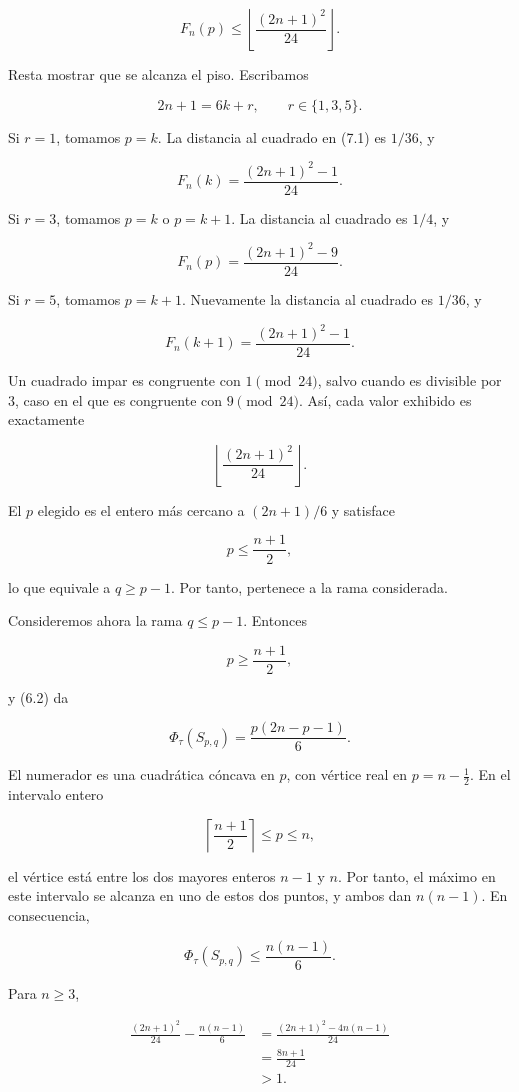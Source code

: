 \documentclass[
  spanish,
  11pt,
  a4paper,
]{article}
\begin{document}
\[
F_n(p)
\le
\left\lfloor\frac{(2n+1)^2}{24}\right\rfloor.
\]

Resta mostrar que se alcanza el piso. Escribamos

\[
2n+1=6k+r,
\qquad
r\in\{1,3,5\}.
\]

Si \(r=1\), tomamos \(p=k\). La distancia al cuadrado en (7.1) es \(1/36\), y

\[
F_n(k)
=
\frac{(2n+1)^2-1}{24}.
\]

Si \(r=3\), tomamos \(p=k\) o \(p=k+1\). La distancia al cuadrado es \(1/4\), y

\[
F_n(p)
=
\frac{(2n+1)^2-9}{24}.
\]

Si \(r=5\), tomamos \(p=k+1\). Nuevamente la distancia al cuadrado es \(1/36\), y

\[
F_n(k+1)
=
\frac{(2n+1)^2-1}{24}.
\]

Un cuadrado impar es congruente con \(1\pmod{24}\), salvo cuando es divisible por \(3\), caso en el que es congruente con \(9\pmod{24}\). Así, cada valor exhibido es exactamente

\[
\left\lfloor\frac{(2n+1)^2}{24}\right\rfloor.
\]

El \(p\) elegido es el entero más cercano a \((2n+1)/6\) y satisface

\[
p\le\frac{n+1}{2},
\]

lo que equivale a \(q\ge p-1\). Por tanto, pertenece a la rama considerada.

Consideremos ahora la rama \(q\le p-1\). Entonces

\[
p\ge\frac{n+1}{2},
\]

y (6.2) da

\[
\Phi_\tau(S_{p,q})
=
\frac{p(2n-p-1)}6.
\]

El numerador es una cuadrática cóncava en \(p\), con vértice real en \(p=n-\tfrac12\). En el intervalo entero

\[
\left\lceil\frac{n+1}{2}\right\rceil
\le p\le n,
\]

el vértice está entre los dos mayores enteros \(n-1\) y \(n\). Por tanto, el máximo en este intervalo se alcanza en uno de estos dos puntos, y ambos dan \(n(n-1)\). En consecuencia,

\[
\Phi_\tau(S_{p,q})
\le
\frac{n(n-1)}6.
\]

Para \(n\ge3\),

\[
\begin{aligned}
\frac{(2n+1)^2}{24}
-
\frac{n(n-1)}6
&=
\frac{(2n+1)^2-4n(n-1)}{24}\\
&=
\frac{8n+1}{24}\\
&>1.
\end{aligned}
\]
\end{document}
